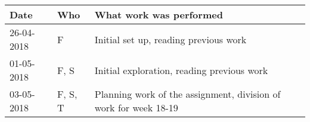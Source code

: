 \documentclass[11pt]{article}
\begin{document}
\begin{table}
\begin{tabular}{lll}
\toprule
Date & Who & What work was performed \\
\midrule
26-04-2018 & F & Initial set up, reading previous work \\
01-05-2018 & F, S & Initial exploration, reading previous work \\
03-05-2018 & F, S, T & Planning work of the assignment, division of work for week 18-19 \\
\bottomrule
\end{tabular}
\end{table}
\end{document}
